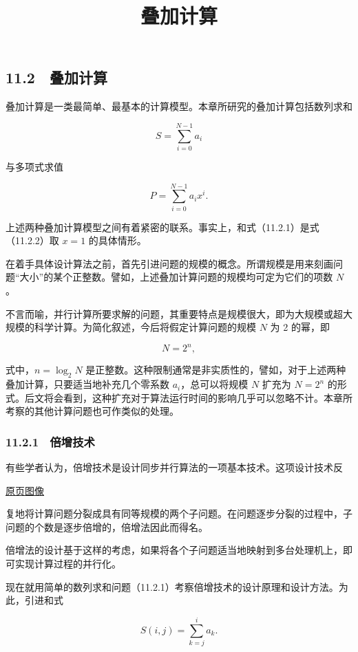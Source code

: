 \documentclass[
  10pt,
  fontset=fandol]{ctexart}
\title{叠加计算}
\author{}
\date{}
\begin{document}
\maketitle

\subsection{11.2　叠加计算}\label{ux53e0ux52a0ux8ba1ux7b97}

叠加计算是一类最简单、最基本的计算模型。本章所研究的叠加计算包括数列求和

\[
S=\sum_{i=0}^{N-1}a_i
\tag{11.2.1}
\]

与多项式求值

\[
P=\sum_{i=0}^{N-1}a_i x^i.
\tag{11.2.2}
\]

上述两种叠加计算模型之间有着紧密的联系。事实上，和式（11.2.1）是式（11.2.2）取 \(x=1\) 的具体情形。

在着手具体设计算法之前，首先引进问题的规模的概念。所谓规模是用来刻画问题``大小''的某个正整数。譬如，上述叠加计算问题的规模均可定为它们的项数 \(N\)。

不言而喻，并行计算所要求解的问题，其重要特点是规模很大，即为大规模或超大规模的科学计算。为简化叙述，今后将假定计算问题的规模 \(N\) 为 2 的幂，即

\[
N=2^n,
\]

式中，\(n=\log_2 N\) 是正整数。这种限制通常是非实质性的，譬如，对于上述两种叠加计算，只要适当地补充几个零系数 \(a_i\)，总可以将规模 \(N\) 扩充为 \(N=2^n\) 的形式。后文将会看到，这种扩充对于算法运行时间的影响几乎可以忽略不计。本章所考察的其他计算问题也可作类似的处理。

\subsubsection{11.2.1　倍增技术}\label{ux500dux589eux6280ux672f}

有些学者认为，倍增技术是设计同步并行算法的一项基本技术。这项设计技术反

\href{../../source-images/pdf-279.jpeg}{原页图像}

复地将计算问题分裂成具有同等规模的两个子问题。在问题逐步分裂的过程中，子问题的个数是逐步倍增的，倍增法因此而得名。

倍增法的设计基于这样的考虑，如果将各个子问题适当地映射到多台处理机上，即可实现计算过程的并行化。

现在就用简单的数列求和问题（11.2.1）考察倍增技术的设计原理和设计方法。为此，引进和式

\[
S(i,j)=\sum_{k=j}^{i}a_k.
\]
\end{document}

